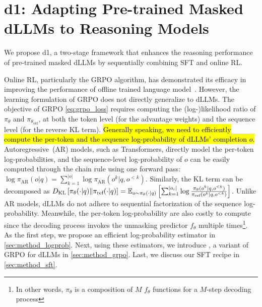 \section{d1: Adapting Pre-trained Masked dLLMs to Reasoning Models}


We propose d1, a two-stage framework that enhances the reasoning performance of pre-trained masked dLLMs by sequentially combining SFT and online RL. 


Online RL, particularly the GRPO algorithm,  has demonstrated its efficacy in improving the performance of offline trained language model~\citep{shao2024deepseekmath, guo2025deepseek, team2025kimi}. 
However, the learning formulation of GRPO does not directly generalize to dLLMs. The objective of GRPO \eqref{eq:grpo_loss} requires computing the (log-)likelihood ratio of $\pi_\theta$ and $\pi_{\theta_{\text{old}}}$, at both the token level (for the advantage weights) and the sequence level (for the reverse KL term). \hl{Generally speaking, we need to efficiently compute the per-token and the sequence log-probability of dLLMs' completion $o$.} Autoregressive~(AR) models, such as Transformers, directly model the per-token log-probabilities, and the sequence-level log-probability of $o$ can be easily computed through the chain rule using one forward pass:
$\log \pi_\text{AR}(o|q) = \sum_{k=1}^{|o|} \log \pi_\text{AR}(o^k|q, o^{<k})$. Similarly, the KL term can be decomposed as
$
D_{\text{KL}}\left[\pi_\theta(\cdot | q)\| \pi_\text{ref}(\cdot | q) \right] = \mathbb{E}_{o \sim \pi_\theta(\cdot \mid q)} \left[ \sum_{k=1}^{|o_i|} \log \frac{\pi_\theta(o^k|q, o^{<k})}{\pi_\text{ref}(o^k|q, o^{<k})}   \right]
$. Unlike AR models, dLLMs do not adhere to sequential factorization of the sequence log-probability. Meanwhile, the per-token log-probability are also costly to compute since the decoding process invokes the unmasking predictor $f_\theta$ multiple times\footnote{In other words, $\pi_\theta$ is a composition of $M$ $f_\theta$ functions for a $M$-step decoding process}. As the first step, we propose an efficient log-probability estimator in \cref{sec:method_logprob}. Next, using these estimators, we introduce \grpo, a variant of GRPO for dLLMs in \cref{sec:method_grpo}. Last, we discuss our SFT recipe in \cref{sec:method_sft}.




\vspace{-2mm}
